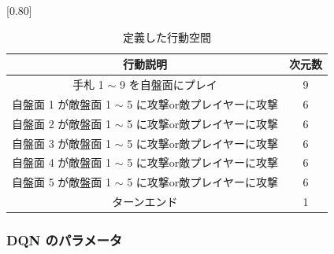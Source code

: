 \documentclass[12pt]{jarticle}
\begin{document}
  \begin{table}[t]
    \centering
    \caption{定義した行動空間}
    \vspace{-0.3cm}
    \label{table:action}
    \scalebox{0.80}[0.80]{
      \begin{tabular}{|c|c|}
        \hline
        行動説明                          & 次元数        \\ \hline \hline
        手札 1 $\sim$ 9 を自盤面にプレイ             & 9          \\ \hline
        自盤面 1 が敵盤面 1 $\sim$ 5 に攻撃or敵プレイヤーに攻撃    & 6          \\ \hline
        自盤面 2 が敵盤面 1 $\sim$ 5 に攻撃or敵プレイヤーに攻撃    & 6          \\ \hline
        自盤面 3 が敵盤面 1 $\sim$ 5 に攻撃or敵プレイヤーに攻撃    & 6          \\ \hline
        自盤面 4 が敵盤面 1 $\sim$ 5 に攻撃or敵プレイヤーに攻撃    & 6          \\ \hline
        自盤面 5 が敵盤面 1 $\sim$ 5 に攻撃or敵プレイヤーに攻撃    & 6          \\ \hline
        ターンエンド & 1 \\ \hline
        \end{tabular}
    }
      \end{table}

\subsubsection{DQN のパラメータ}
\end{document}
